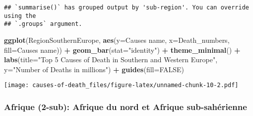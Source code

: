 \documentclass[
]{article}
\newenvironment{Shaded}{\begin{snugshade}}{\end{snugshade}}
\newcommand{\AttributeTok}[1]{\textcolor[rgb]{0.13,0.29,0.53}{#1}}
\newcommand{\ConstantTok}[1]{\textcolor[rgb]{0.56,0.35,0.01}{#1}}
\newcommand{\FunctionTok}[1]{\textcolor[rgb]{0.13,0.29,0.53}{\textbf{#1}}}
\newcommand{\NormalTok}[1]{#1}
\newcommand{\SpecialCharTok}[1]{\textcolor[rgb]{0.81,0.36,0.00}{\textbf{#1}}}
\newcommand{\StringTok}[1]{\textcolor[rgb]{0.31,0.60,0.02}{#1}}
\begin{document}
\begin{verbatim}
## `summarise()` has grouped output by 'sub-region'. You can override using the
## `.groups` argument.
\end{verbatim}

\begin{Shaded}
\begin{Highlighting}[]
\FunctionTok{ggplot}\NormalTok{(RegionSouthernEurope, }\FunctionTok{aes}\NormalTok{(}\AttributeTok{y=}\StringTok{\textasciigrave{}}\AttributeTok{Causes name}\StringTok{\textasciigrave{}}\NormalTok{, }\AttributeTok{x=}\NormalTok{Death\_numbers, }\AttributeTok{fill=}\StringTok{\textasciigrave{}}\AttributeTok{Causes name}\StringTok{\textasciigrave{}}\NormalTok{)) }\SpecialCharTok{+}
  \FunctionTok{geom\_bar}\NormalTok{(}\AttributeTok{stat=}\StringTok{"identity"}\NormalTok{) }\SpecialCharTok{+}
  \FunctionTok{theme\_minimal}\NormalTok{() }\SpecialCharTok{+} 
  \FunctionTok{labs}\NormalTok{(}\AttributeTok{title=}\StringTok{"Top 5 Causes of Death in Southern and Western Europe"}\NormalTok{,}
       \AttributeTok{y=}\StringTok{"Number of Deaths in millions"}\NormalTok{) }\SpecialCharTok{+}
  \FunctionTok{guides}\NormalTok{(}\AttributeTok{fill=}\ConstantTok{FALSE}\NormalTok{)}
\end{Highlighting}
\end{Shaded}

\texttt{[image: causes-of-death\_files/figure-latex/unnamed-chunk-10-2.pdf]}

\hypertarget{afrique-2-sub-afrique-du-nord-et-afrique-sub-sahuxe9rienne}{%
\subsubsection{Afrique (2-sub): Afrique du nord et Afrique
sub-sahérienne}\label{afrique-2-sub-afrique-du-nord-et-afrique-sub-sahuxe9rienne}}
\end{document}
